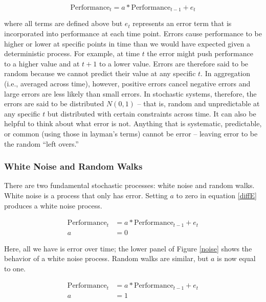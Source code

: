 \documentclass[english,,man]{apa6}
\theoremstyle{definition}
\theoremstyle{definition}
\theoremstyle{definition}
\theoremstyle{remark}
\begin{document}
\begin{equation}
\label{diffE}
\textrm{Performance}_{t} = a * \textrm{Performance}_{t-1} + e_{t}
\end{equation}

\noindent where all terms are defined above but \(e_{t}\) represents an
error term that is incorporated into performance at each time point.
Errors cause performance to be higher or lower at specific points in
time than we would have expected given a deterministic process. For
example, at time \(t\) the error might push performance to a higher
value and at \(t+1\) to a lower value. Errors are therefore said to be
random because we cannot predict their value at any specific \(t\). In
aggregation (i.e., averaged across time), however, positive errors
cancel negative errors and large errors are less likely than small
errors. In stochastic systems, therefore, the errors are said to be
distributed \(N(0, 1)\) -- that is, random and unpredictable at any
specific \(t\) but distributed with certain constraints across time. It
can also be helpful to think about what error is not. Anything that is
systematic, predictable, or common (using those in layman's terms)
cannot be error -- leaving error to be the random \enquote{left overs.}

\hypertarget{white-noise-and-random-walks}{%
\subsubsection{White Noise and Random
Walks}\label{white-noise-and-random-walks}}

There are two fundamental stochastic processes: white noise and random
walks. White noise is a process that only has error. Setting \(a\) to
zero in equation \ref{diffE} produces a white noise process.

\begin{equation}
\begin{split}
\label{whitenoise}
\textrm{Performance}_{t} &= a * \textrm{Performance}_{t-1} + e_{t} \\
a &= 0
\end{split}
\end{equation}

\noindent Here, all we have is error over time; the lower panel of
Figure \ref{noise} shows the behavior of a white noise process. Random
walks are similar, but \(a\) is now equal to one.

\begin{equation}
\begin{split}
\label{rw}
\textrm{Performance}_{t} &= a * \textrm{Performance}_{t-1} + e_{t} \\ 
a &= 1 \\ 
\end{split}
\end{equation}
\end{document}
